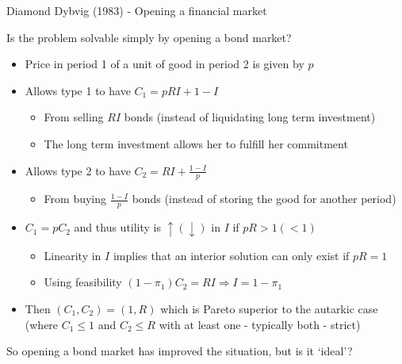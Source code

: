 \begin{frame}{Diamond Dybvig (1983) - Opening a financial market}

Is the problem solvable simply by opening a bond market?
	\begin{itemize}
	\item	Price in period 1 of a unit of good in period 2 is given by $p$
	\vspace{1mm}
	\item	Allows type 1 to have $C_{1} = pRI + 1 - I$
		\begin{itemize}
		\item	From selling $RI$ bonds (instead of liquidating long term investment)
		\item	The long term investment allows her to fulfill her commitment
		\end{itemize}
	\vspace{1mm}
	\item	Allows type 2 to have $C_{2} = RI + \frac{1-I}{p}$
		\begin{itemize}
		\item	From buying $\frac{1-I}{p}$ bonds (instead of storing the good for another period)
		\end{itemize}
	\vspace{1mm}
	\item	$C_{1}=pC_{2}$ and thus utility is $\uparrow(\downarrow)$ in $I$ if $pR>1(<1)$
		\begin{itemize}
		\item	Linearity in $I$ implies that an interior solution can only exist if $pR=1$
		\item	Using feasibility $(1-\pi_{1})C_{2} = RI \Rightarrow I = 1-\pi_{1}$
		\end{itemize}
	\vspace{1mm}
	\item	Then $(C_{1},C_{2})=(1,R)$ which is Pareto superior to the autarkic case (where $C_{1}\leq1$ and $C_{2}\leq R$ with at least one - typically both - strict)
	\end{itemize}
\vspace{2mm}
So opening a bond market has improved the situation, but is it `ideal'?

\end{frame}



